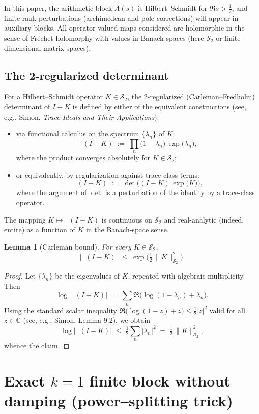 \documentclass[11pt]{article}
\newtheorem{lemma}[theorem]{Lemma}
\theoremstyle{remark}
\newcommand{\C}{\mathbb{C}}
\newcommand{\HS}{\mathcal{S}_2}
\DeclareMathOperator{\dettwo}{det_2}
\begin{document}
In this paper, the arithmetic block \(A(s)\) is Hilbert--Schmidt for \(\Re s>\tfrac12\), and finite-rank perturbations (archimedean and pole corrections) will appear in auxiliary blocks. All operator-valued maps considered are holomorphic in the sense of Fr\'echet holomorphy with values in Banach spaces (here \(\HS\) or finite-dimensional matrix spaces).

\subsection{The 2-regularized determinant \(\dettwo\)}
For a Hilbert--Schmidt operator \(K\in\HS\), the 2-regularized (Carleman--Fredholm) determinant of \(I-K\) is defined by either of the equivalent constructions (see, e.g., Simon, \emph{Trace Ideals and Their Applications}):
\begin{itemize}
 \item via functional calculus on the spectrum \(\{\lambda_n\}\) of \(K\):
 \[
  \dettwo(I-K)\;:=\;\prod_{n}\big(1-\lambda_n\big)\,\exp\!\big(\lambda_n\big),
 \]
 where the product converges absolutely for \(K\in\HS\);
 \item or equivalently, by regularization against trace-class terms:
 \[
  \dettwo(I-K)\;:=\;\det\!\Big((I-K)\,\exp\big(K\big)\Big),
 \]
 where the argument of \(\det\) is a perturbation of the identity by a trace-class operator.
\end{itemize}
The mapping \(K\mapsto \dettwo(I-K)\) is continuous on \(\HS\) and real-analytic (indeed, entire) as a function of \(K\) in the Banach-space sense.

\begin{lemma}[Carleman bound]\label{lem:carleman}
For every \(K\in\HS\),
\[
 \big|\dettwo(I-K)\big|\;\le\; \exp\!\Big(\tfrac12\,\|K\|_{\HS}^2\Big).
\]
\end{lemma}
\begin{proof}
Let \(\{\lambda_n\}\) be the eigenvalues of \(K\), repeated with algebraic multiplicity. Then
\[
 \log\big|\dettwo(I-K)\big|\;=\; \sum_n \Re\Big(\log(1-\lambda_n)+\lambda_n\Big).
\]
Using the standard scalar inequality \(\Re\big(\log(1-z)+z\big)\le \tfrac12 |z|^2\) valid for all \(z\in\C\) (see, e.g., Simon, Lemma 9.2), we obtain
\[
 \log\big|\dettwo(I-K)\big|\;\le\; \tfrac12\sum_n |\lambda_n|^2\;=\;\tfrac12\,\|K\|_{\HS}^2,
\]
whence the claim.
\end{proof}

\section*{Exact $k=1$ finite block without damping (power--splitting trick)}
\end{document}
